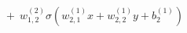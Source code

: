\documentclass[preview]{standalone}
\begin{document}
\begin{align*}
+ \ \ w_{1,2}^{(2)} \sigma(w_{2,1}^{(1)}x + w_{2,2}^{(1)}y +b_2^{(1)})
\end{align*}
\end{document}

